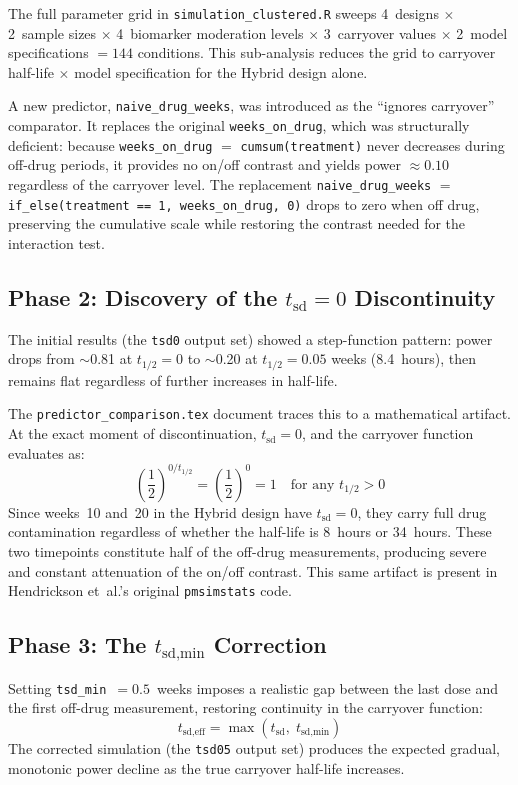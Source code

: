 \documentclass[11pt]{article}
\begin{document}
The full parameter grid in \texttt{simulation\_clustered.R} sweeps
4~designs $\times$ 2~sample sizes $\times$ 4~biomarker moderation
levels $\times$ 3~carryover values $\times$ 2~model specifications
$= 144$ conditions. This sub-analysis reduces the grid to carryover
half-life $\times$ model specification for the Hybrid design alone.

A new predictor, \texttt{naive\_drug\_weeks}, was introduced as the
``ignores carryover'' comparator. It replaces the original
\texttt{weeks\_on\_drug}, which was structurally deficient: because
\texttt{weeks\_on\_drug} $=$ \texttt{cumsum(treatment)} never
decreases during off-drug periods, it provides no on/off contrast and
yields power $\approx 0.10$ regardless of the carryover level. The
replacement \texttt{naive\_drug\_weeks} $=$
\texttt{if\_else(treatment == 1, weeks\_on\_drug, 0)} drops to zero
when off drug, preserving the cumulative scale while restoring the
contrast needed for the interaction test.

\subsection{Phase 2: Discovery of the $t_{\text{sd}} = 0$
  Discontinuity}

The initial results (the \texttt{tsd0} output set) showed a
step-function pattern: power drops from $\sim$0.81 at $t_{1/2} = 0$
to $\sim$0.20 at $t_{1/2} = 0.05$ weeks (8.4~hours), then remains
flat regardless of further increases in half-life.

The \texttt{predictor\_comparison.tex} document traces this to a
mathematical artifact. At the exact moment of discontinuation,
$t_{\text{sd}} = 0$, and the carryover function evaluates as:
\[
  \left(\frac{1}{2}\right)^{0 / t_{1/2}}
  = \left(\frac{1}{2}\right)^{0} = 1
  \quad \text{for any } t_{1/2} > 0
\]
Since weeks~10 and~20 in the Hybrid design have $t_{\text{sd}} = 0$,
they carry full drug contamination regardless of whether the half-life
is 8~hours or 34~hours. These two timepoints constitute half of the
off-drug measurements, producing severe and constant attenuation of
the on/off contrast. This same artifact is present in Hendrickson
et~al.'s original \texttt{pmsimstats} code.

\subsection{Phase 3: The $t_{\text{sd,min}}$ Correction}

Setting \texttt{tsd\_min}~$= 0.5$~weeks imposes a realistic gap
between the last dose and the first off-drug measurement, restoring
continuity in the carryover function:
\[
  t_{\text{sd,eff}} = \max(t_{\text{sd}},\; t_{\text{sd,min}})
\]
The corrected simulation (the \texttt{tsd05} output set) produces the
expected gradual, monotonic power decline as the true carryover
half-life increases.
\end{document}
